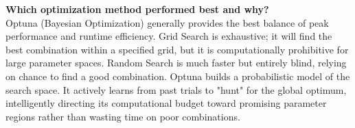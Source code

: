 \documentclass[12pt,a4paper]{article}
\begin{document}
\vspace{10pt}

\textbf{Which optimization method performed best and why?} \\
Optuna (Bayesian Optimization) generally provides the best balance of peak performance and runtime efficiency. Grid Search is exhaustive; it will find the best combination within a specified grid, but it is computationally prohibitive for large parameter spaces. Random Search is much faster but entirely blind, relying on chance to find a good combination. Optuna builds a probabilistic model of the search space. It actively learns from past trials to "hunt" for the global optimum, intelligently directing its computational budget toward promising parameter regions rather than wasting time on poor combinations.
\end{document}
